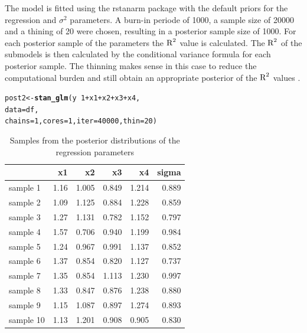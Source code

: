 \documentclass[11pt,a4paper,twoside]{book}
\makeatletter
\newcommand{\hlnum}[1]{\textcolor[rgb]{0.686,0.059,0.569}{#1}}%
\newcommand{\hlopt}[1]{\textcolor[rgb]{0,0,0}{#1}}%
\newcommand{\hlstd}[1]{\textcolor[rgb]{0.345,0.345,0.345}{#1}}%
\newcommand{\hlkwb}[1]{\textcolor[rgb]{0.69,0.353,0.396}{#1}}%
\newcommand{\hlkwc}[1]{\textcolor[rgb]{0.333,0.667,0.333}{#1}}%
\newcommand{\hlkwd}[1]{\textcolor[rgb]{0.737,0.353,0.396}{\textbf{#1}}}%
\newenvironment{kframe}{%
 \def\at@end@of@kframe{}%
 \ifinner\ifhmode%
  \def\at@end@of@kframe{\end{minipage}}%
  \begin{minipage}{\columnwidth}%
 \fi\fi%
 \def\FrameCommand##1{\hskip\@totalleftmargin \hskip-\fboxsep
 \colorbox{shadecolor}{##1}\hskip-\fboxsep
     \hskip-\linewidth \hskip-\@totalleftmargin \hskip\columnwidth}%
 \MakeFramed {\advance\hsize-\width
   \@totalleftmargin\z@ \linewidth\hsize
   \@setminipage}}%
 {\par\unskip\endMakeFramed%
 \at@end@of@kframe}
\newenvironment{knitrout}{}{} %
\makeatother
\begin{document}
The model is fitted using the rstanarm package with the default priors for the regression and $\sigma^2$ parameters. A burn-in periode of 1000, a sample size of 20000 and a thining of 20 were chosen, resulting in a posterior sample size of 1000. For each posterior sample of the parameters the $\text{R}^2$ value is calculated. The $\text{R}^2$ of the submodels is then calculated by the conditional variance formula for each posterior sample. The thinning makes sense in this case to reduce the computational burden and still obtain an appropriate posterior of the $\text{R}^2$ values \citep{Link2012}. 


\begin{knitrout}
\color{fgcolor}\begin{kframe}
\begin{alltt}
\hlstd{post2} \hlkwb{<-} \hlkwd{stan_glm}\hlstd{(y} \hlopt{~} \hlnum{1} \hlopt{+} \hlstd{x1} \hlopt{+} \hlstd{x2} \hlopt{+} \hlstd{x3} \hlopt{+} \hlstd{x4,}
                  \hlkwc{data} \hlstd{= df,}
                  \hlkwc{chains} \hlstd{=} \hlnum{1}\hlstd{,} \hlkwc{cores} \hlstd{=}\hlnum{1}\hlstd{,} \hlkwc{iter}\hlstd{=}\hlnum{40000}\hlstd{,} \hlkwc{thin}\hlstd{=}\hlnum{20}\hlstd{)}
\end{alltt}
\end{kframe}
\end{knitrout}

\begin{knitrout}
\color{fgcolor}\begin{table}

\caption{\label{tab:simdata.postsample2}Samples from the posterior distributions of the regression parameters}
\centering
\begin{tabular}[t]{lrrrrr}
\toprule
  & x1 & x2 & x3 & x4 & sigma\\
\midrule
sample 1 & 1.16 & 1.005 & 0.849 & 1.214 & 0.889\\
sample 2 & 1.09 & 1.125 & 0.884 & 1.228 & 0.859\\
sample 3 & 1.27 & 1.131 & 0.782 & 1.152 & 0.797\\
sample 4 & 1.57 & 0.706 & 0.940 & 1.199 & 0.984\\
sample 5 & 1.24 & 0.967 & 0.991 & 1.137 & 0.852\\
sample 6 & 1.37 & 0.854 & 0.820 & 1.127 & 0.737\\
sample 7 & 1.35 & 0.854 & 1.113 & 1.230 & 0.997\\
sample 8 & 1.33 & 0.847 & 0.876 & 1.238 & 0.880\\
sample 9 & 1.15 & 1.087 & 0.897 & 1.274 & 0.893\\
sample 10 & 1.13 & 1.201 & 0.908 & 0.905 & 0.830\\
\bottomrule
\end{tabular}
\end{table}


\end{knitrout}
\end{document}
